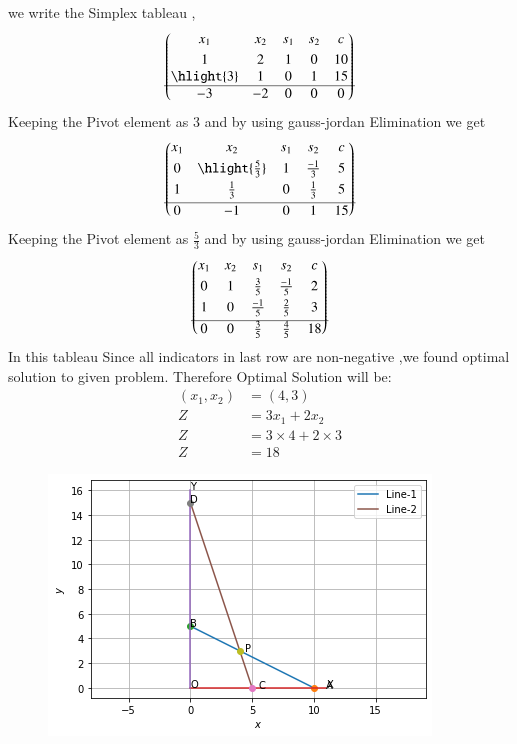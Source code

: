 \begin{enumerate}[label=\thesection.\arabic*.,ref=\thesection.\theenumi]
\begin{enumerate}
    we write the Simplex tableau , \\
    \begin{align}
    \myvec{
    x_1 & x_2 & s_1 & s_2 & c \\[0.1cm]
    1 & 2  & 1 & 0 & 10 \\
    \hlight{3} & 1 & 0 & 1 & 15\\ \hline
    -3 & -2 & 0 & 0 & 0
    }
    \end{align}
    Keeping the Pivot element as $3$  and by using gauss-jordan Elimination we get \\
    \begin{align}
    \myvec{
    x_1 & x_2 & s_1 & s_2 & c \\[0.1cm]
    0 & \hlight{\frac{5}{3}}  & 1 & \frac{-1}{3} & 5 \\[0.1cm]
    1 & \frac{1}{3} & 0 & \frac{1}{3} & 5  \\[0.1cm] \hline
    0 & -1   & 0 & 1 & 15
    }
    \end{align}
    Keeping the Pivot element as $\frac{5}{3}$  and by using gauss-jordan Elimination we get \\
    \begin{align}
    \begin{pmatrix}
    x_1 & x_2 & s_1 & s_2 & c \\[0.1cm]
    0 & 1  & \frac{3}{5} & \frac{-1}{5} & 2 \\[0.1cm]
    1 & 0 & \frac{-1}{5} & \frac{2}{5} & 3\\[0.1cm] \hline
    0 & 0   & \frac{3}{5} & \frac{4}{5} & 18
    \end{pmatrix}
    \end{align}
    In this tableau Since all  indicators in last row are non-negative ,we found optimal  solution to given problem.
    Therefore  Optimal Solution will be: \\
    \begin{align}
        (x_1,x_2) &= (4,3) \\
        Z &= 3x_1+2x_2 \\
        Z &= 3 \times 4 + 2 \times 3 \\
        Z &= 18
    \end{align}
    \begin{figure}[h]
    \includegraphics[width=\columnwidth]{Figure_1.png}

\end{figure}
\end{enumerate}
\end{enumerate}
